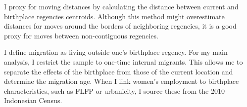 I proxy for moving distances by calculating the distance between current and birthplace regencies centroids. Although this method might overestimate distances for moves around the borders of neighboring regencies, it is a good proxy for moves between non-contiguous regencies.

I define migration as living outside one's birthplace regency. For my main analysis, I restrict the sample to one-time internal migrants. This allows me to separate the effects of the birthplace from those of the current location and determine the migration age. When I link women's employment to birthplace characteristics, such as FLFP or urbanicity, I source these from the 2010 Indonesian Census.